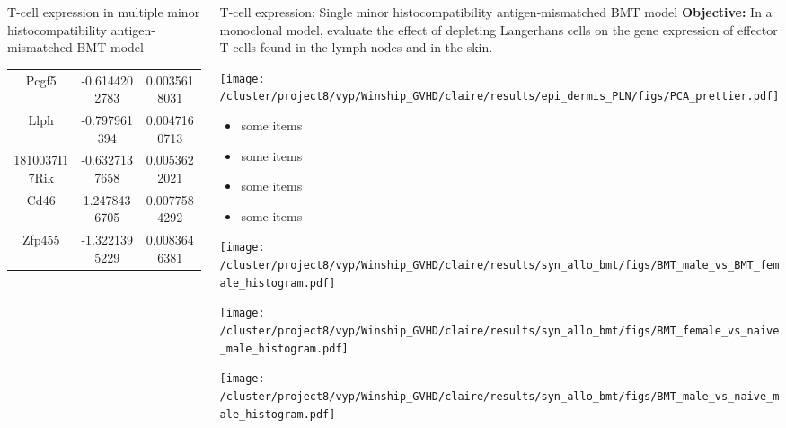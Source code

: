 \documentclass[final,hyperref={pdfpagelabels=false}]{beamer}
\begin{document}
\begin{frame}{}
\begin{columns}[t]
\begin{column}{.24\linewidth}
\begin{block}{T-cell expression in multiple minor histocompatibility antigen-mismatched BMT model}
\begin{center}
\begin{tabular}{ |c|c|c| }
	      Pcgf5 & -0.6144202783 & 0.0035618031 \\
	      Llph & -0.797961394 & 0.0047160713 \\
	      1810037I17Rik & -0.6327137658 & 0.0053622021 \\
	      Cd46 & 1.2478436705 & 0.0077584292 \\
	      Zfp455 & -1.3221395229 & 0.0083646381 \\
	      \hline
	    \end{tabular}
	  \end{center}
        \end{block}
      \end{column}
      \begin{column}{.25\linewidth}
        \begin{block}{T-cell expression: Single minor histocompatibility antigen-mismatched BMT model}
	  {\bf Objective:} In a monoclonal model, evaluate the effect of depleting Langerhans cells on the gene expression of effector T cells found in the lymph nodes and in the skin.
	  \begin{center}
	   \texttt{[image: /cluster/project8/vyp/Winship\_GVHD/claire/results/epi\_dermis\_PLN/figs/PCA\_prettier.pdf]}
            \end{center}
          \begin{itemize}
          \item some items
          \item some items
          \item some items
          \item some items
          \end{itemize}
	  \begin{minipage}{0.45\textwidth}
            \texttt{[image: /cluster/project8/vyp/Winship\_GVHD/claire/results/syn\_allo\_bmt/figs/BMT\_male\_vs\_BMT\_female\_histogram.pdf]}
          \end{minipage}
          \begin{minipage}{0.45\textwidth}
            \texttt{[image: /cluster/project8/vyp/Winship\_GVHD/claire/results/syn\_allo\_bmt/figs/BMT\_female\_vs\_naive\_male\_histogram.pdf]}
          \end{minipage}
	  \begin{minipage}{0.45\textwidth}
            \texttt{[image: /cluster/project8/vyp/Winship\_GVHD/claire/results/syn\_allo\_bmt/figs/BMT\_male\_vs\_naive\_male\_histogram.pdf]}
          \end{minipage}

\end{block}
\end{column}
\end{columns}
\end{frame}
\end{document}
